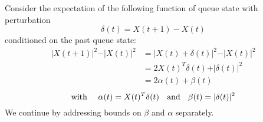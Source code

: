 \label{distributedproof}


Consider the expectation of the following function of queue state with perturbation 
\begin{equation} \label{delta_def}
\delta(t) = X(t+1) - X(t)
\end{equation}  
conditioned on the past queue state:
\begin{align}
\vert X(t+1) \vert^2  - \vert X(t)\vert^2 &= \vert X(t) + \delta (t) \vert^2 - \vert X(t)\vert^2 \\
\nonumber &= 2X(t)^{T}\delta(t) + \vert \delta(t)  \vert^2 \\
\nonumber &= 2\alpha(t) + \beta(t) 
\end{align}
\begin{equation} \label{alpha_beta_defs}
\text{with \quad} \alpha(t)  = X(t)^{T}\delta(t)  \text{   \; and \;  }\beta(t) = \vert \delta (t) \vert^{2}
\end{equation}
We continue by addressing bounds on $\beta$ and $\alpha$ separately. 
